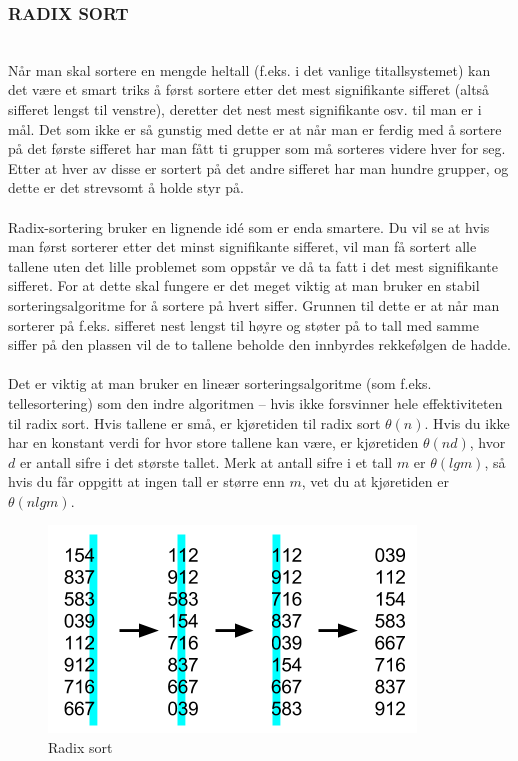 \subsubsection{RADIX SORT}\\
Når man skal sortere en mengde heltall (f.eks. i det vanlige titallsystemet) kan det være et smart triks å først sortere etter det mest signifikante sifferet (altså sifferet lengst til venstre), deretter det nest mest signifikante osv. til man er i mål. Det som ikke er så gunstig med dette er at når man er ferdig med å sortere på det første sifferet har man fått ti grupper som må sorteres videre hver for seg. Etter at hver av disse er sortert på det andre sifferet har man hundre grupper, og dette er det strevsomt å holde styr på.
\\\\
Radix-sortering bruker en lignende idé som er enda smartere. Du vil se at hvis man først sorterer etter det minst signifikante sifferet, vil man få sortert alle tallene uten det lille problemet som oppstår ve då ta fatt i det mest signifikante sifferet. For at dette skal fungere er det meget viktig at man bruker en stabil sorteringsalgoritme for å sortere på hvert siffer. Grunnen til dette er at når man sorterer på f.eks. sifferet nest lengst til høyre og støter på to tall med samme siffer på den plassen vil de to tallene beholde den innbyrdes rekkefølgen de hadde.
\\\\
Det er viktig at man bruker en lineær sorteringsalgoritme (som f.eks. tellesortering) som den indre algoritmen – hvis ikke forsvinner hele effektiviteten til radix sort. Hvis tallene er små, er kjøretiden til radix sort $\theta(n)$. Hvis du ikke har en konstant verdi for hvor store tallene kan være, er kjøretiden $\theta(nd)$, hvor $d$ er antall sifre i det største tallet. Merk at antall sifre i et tall $m$ er $\theta(lg m)$, så hvis du får oppgitt at ingen tall er større enn $m$, vet du at kjøretiden er $\theta(n lg m)$. 

\begin{figure}[H]
\includegraphics[scale=0.7]{images/radixsort}
\centering %
\caption{Radix sort}
\label{fig:radixsort}
\end{figure}

